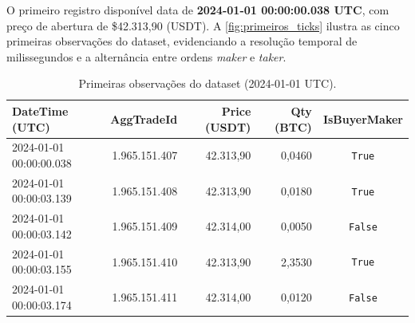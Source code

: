 O primeiro registro disponível data de \textbf{2024-01-01 00:00:00.038 UTC},
com preço de abertura de \$42.313,90 (USDT). A \autoref{fig:primeiros_ticks}
ilustra as cinco primeiras observações do dataset, evidenciando a resolução
temporal de milissegundos e a alternância entre ordens \textit{maker} e
\textit{taker}.

\begin{table}[ht]
    \centering
    \caption{Primeiras observações do dataset (2024-01-01 UTC).}
    \label{fig:primeiros_ticks}
    \begin{tabular}{lrrrc}
        \toprule
        \textbf{DateTime (UTC)}              & \textbf{AggTradeId} & \textbf{Price (USDT)} & \textbf{Qty (BTC)} & \textbf{IsBuyerMaker} \\
        \midrule
        2024-01-01 00:00:00.038 & 1.965.151.407 & 42.313,90 & 0,0460 & \texttt{True}  \\
        2024-01-01 00:00:03.139 & 1.965.151.408 & 42.313,90 & 0,0180 & \texttt{True}  \\
        2024-01-01 00:00:03.142 & 1.965.151.409 & 42.314,00 & 0,0050 & \texttt{False} \\
        2024-01-01 00:00:03.155 & 1.965.151.410 & 42.313,90 & 2,3530 & \texttt{True}  \\
        2024-01-01 00:00:03.174 & 1.965.151.411 & 42.314,00 & 0,0120 & \texttt{False} \\
        \bottomrule
    \end{tabular}
\end{table}
